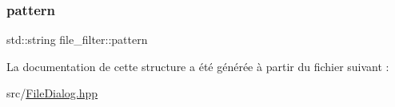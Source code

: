 \mbox{\label{structfile__filter_a66658e1ec5a2c6a586d9855f12779a04}} 
\subsubsection{\texorpdfstring{pattern}{pattern}}
{\footnotesize\ttfamily std\+::string file\+\_\+filter\+::pattern}



La documentation de cette structure a été générée à partir du fichier suivant \+:\begin{DoxyCompactItemize}
\item 
src/\hyperlink{_file_dialog_8hpp}{File\+Dialog.\+hpp}\end{DoxyCompactItemize}
